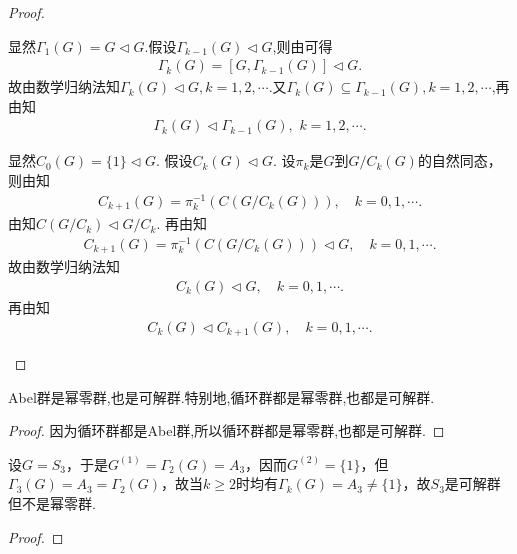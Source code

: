 \documentclass[../../main.tex]{subfiles}%
\begin{document}
\begin{proof}
\begin{enumerate}[(1)]
显然$\Gamma_1(G)=G\lhd G$.假设$\Gamma_{k-1}(G)\lhd G$,则由可得
\begin{align*}
\Gamma_k(G)=[G,\Gamma_{k-1}(G)]\lhd  G.
\end{align*}
故由数学归纳法知$\Gamma_k(G)\lhd G,k=1,2,\cdots.$又$\Gamma_k(G)\subseteq \Gamma_{k-1}(G),k=1,2,\cdots$,再由知
\begin{align*}
\Gamma_k(G)\lhd \Gamma_{k-1}(G),\,\,k=1,2,\cdots.
\end{align*}

显然$C_0(G) = \{1\} \lhd G$. 假设$C_k(G) \lhd G$. 设$\pi_k$是$G$到$G/C_k(G)$的自然同态，则由知
\begin{align*}
C_{k+1}(G) = \pi_k^{-1}\left(C\left(G/C_k(G)\right)\right),\quad k=0,1,\cdots.
\end{align*}
由知$C(G/C_k) \lhd G/C_k$. 再由知
\begin{align*}
C_{k+1}(G) = \pi_k^{-1}\left(C\left(G/C_k(G)\right)\right) \lhd G,\quad k=0,1,\cdots.
\end{align*}
故由数学归纳法知
\begin{align*}
C_k(G) \lhd G,\quad k=0,1,\cdots.
\end{align*}
再由知
\begin{align*}
C_k(G) \lhd C_{k+1}(G),\quad k=0,1,\cdots.
\end{align*}

\end{enumerate}

\end{proof}

\begin{proposition}\label{proposition:Abel群都是幂零群也都是可解群}
Abel群是幂零群,也是可解群.特别地,循环群都是幂零群,也都是可解群.
\end{proposition}
\begin{proof}

因为循环群都是Abel群,所以循环群都是幂零群,也都是可解群.

\end{proof}

\begin{example}
设$G = S_3$，于是$G^{(1)} = \Gamma_2(G) = A_3$，因而$G^{(2)} = \{1\}$，但$\Gamma_3(G) = A_3 = \Gamma_2(G)$，故当$k \geqslant 2$时均有$\Gamma_k(G) = A_3 \neq \{1\}$，故$S_3$是可解群但不是幂零群.
\end{example}
\begin{proof}



\end{proof}
\end{document}

